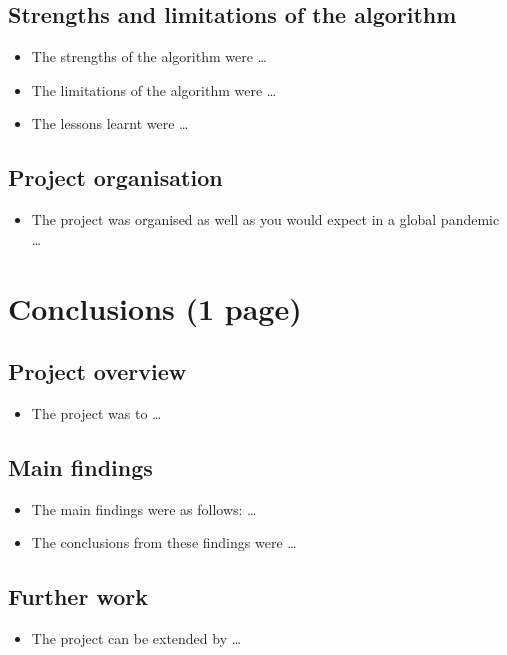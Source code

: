 \documentclass[12pt,a4paper]{article}
\begin{document}
\subsection{Strengths and limitations of the algorithm} 
\begin{itemize}
    \item The strengths of the algorithm were \dots
    \item The limitations of the algorithm were \dots
    \item The lessons learnt were \dots
\end{itemize}

\subsection{Project organisation}
\begin{itemize}
    \item The project was organised as well as you would expect in a global pandemic \dots
\end{itemize}

\section{Conclusions (1 page)}
\subsection{Project overview}
\begin{itemize}
    \item The project was to \dots
\end{itemize}

\subsection{Main findings}
\begin{itemize}
    \item The main findings were as follows: \dots
    \item The conclusions from these findings were \dots
\end{itemize}

\subsection{Further work}
\begin{itemize}
    \item The project can be extended by \dots
\end{itemize}

\cite{}

\end{document}
